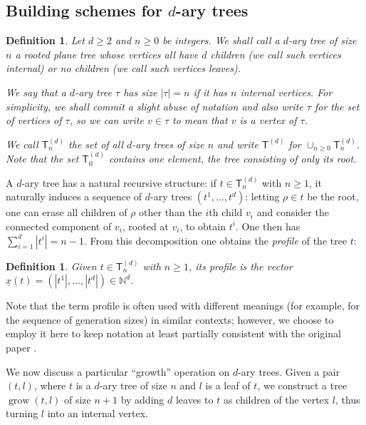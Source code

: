 \documentclass[11pt]{article}
\renewcommand{\geq}{\geqslant}
\newcommand{\sT}{\mathsf{T}} %
\newcommand{\grow}{\operatorname{grow}}
\newtheorem{defn}[thm]{Definition}
\begin{document}
\subsection{Building schemes for $d$-ary trees}


\begin{defn}\label{def:complete d-ary tree}
Let $d\geq 2$ and $n\geq 0$ be integers. We shall call a \emph{$d$-ary tree of size $n$} a rooted plane tree whose vertices all have $d$ children 
(we call such vertices \emph{internal}) or no children (we call such vertices \emph{leaves}).


We say that a $d$-ary tree $\tau$ has \emph{size} $|\tau|=n$ if it has $n$ internal vertices. For simplicity, we shall commit a slight abuse of notation and also write $\tau$ for the set of vertices of $\tau$, so we can write $v\in \tau$ to mean that $v$ is a vertex of $\tau$.

We call $\sT_n^{(d)}$ the set of all $d$-ary trees of size $n$ and write $\sT^{(d)}$ for $\cup_{n\geq 0}\sT_n^{(d)}$. Note that the set $\sT^{(d)}_0$ contains one element, the tree consisting of only its root.
\end{defn}

A $d$-ary tree has a natural recursive structure: if $t\in\sT_n^{(d)}$ with $n\geq 1$, it naturally induces a sequence of $d$-ary trees $(t^1,\ldots, t^d)$: letting $\rho\in t$ be the root, one can erase all children of $\rho$ other than the $i$th child $v_i$ and consider the connected component of $v_i$, rooted at $v_i$, to obtain $t^i$. One then has $\sum_{i=1}^d|t^i|=n-1$. From this decomposition one obtains the \emph{profile} of the tree $t$:

\begin{defn}
Given $t\in \sT_n^{(d)}$ with $n\geq 1$, its \emph{profile} is the vector $\underline{x}(t)=(|t^1|,\ldots,|t^d|)\in \mathbb{N}^d$.	
\end{defn}

Note that the term profile is often used with different meanings (for example, for the sequence of generation sizes) in similar contexts; however, we choose to employ it here to keep notation at least partially consistent with the original paper \cite{LW04}.

We now discuss a particular ``growth'' operation on $d$-ary trees. Given a pair $(t,l)$, where $t$ is a $d$-ary tree of size $n$ and $l$ is a leaf of $t$, we construct a tree $\grow(t,l)$ of size $n+1$ by adding $d$ leaves to $t$ as children of the vertex $l$, thus turning $l$ into an internal vertex. 
\end{document}
